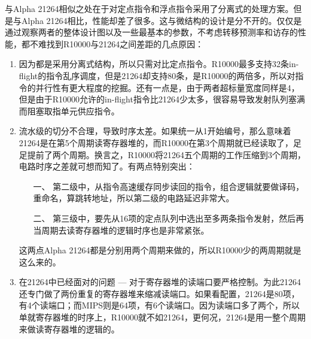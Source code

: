 与Alpha 21264相似之处在于对定点指令和浮点指令采用了分离式的处理方案。但是与Alpha 21264相比，性能却差了很多。这与微结构的设计是分不开的。仅仅是通过观察两者的整体设计图以及一些最基本的参数，不考虑转移预测率和访存的性能，都不难找到R10000与21264之间差距的几点原因：
\begin{enumerate}[label=(\alph*)]
	\item 因为都是采用分离式结构，所以只需对比定点指令。R10000最多支持32条in-flight的指令乱序调度，但是21264却支持80条，是R10000的两倍多，所以对指令的并行性有更大程度的挖掘。还有一点是，由于两者超标量宽度同样是4，但是由于R10000允许的in-flight指令比21264少太多，很容易导致发射队列塞满而阻塞取指单元供应指令。
	\item 流水级的切分不合理，导致时序太差。如果统一从1开始编号，那么意味着21264是在第5个周期读寄存器堆的，而R10000在第3个周期就已经读取了，足足提前了两个周期。换言之，R10000将21264五个周期的工作压缩到3个周期，电路时序之差就可想而知了。有两点特别突出：
	\begin{enumerate}
		\item[一、] 第二级中，从指令高速缓存同步读回的指令，组合逻辑就要做译码，重命名，算跳转地址，所以第二级的电路延迟非常大。
		\item[二、] 第三级中，要先从16项的定点队列中选出至多两条指令发射，然后再当周期去读寄存器堆的逻辑时序也是非常紧张。
	\end{enumerate}

	这两点Alpha 21264都是分别用两个周期来做的，所以R10000少的两周期就是这么来的。
	\item 在21264中已经面对的问题 --- 对于寄存器堆的读端口要严格控制。为此21264还专门做了两份重复的寄存器堆来缩减读端口。如果看配置，21264是80项，有4个读端口；而MIPS则是64项，有6个读端口。因为读端口多了两个，所以单就寄存器堆的时序上，R10000就不如21264，更何况，21264是用一整个周期来做读寄存器堆的逻辑的。
\end{enumerate}

